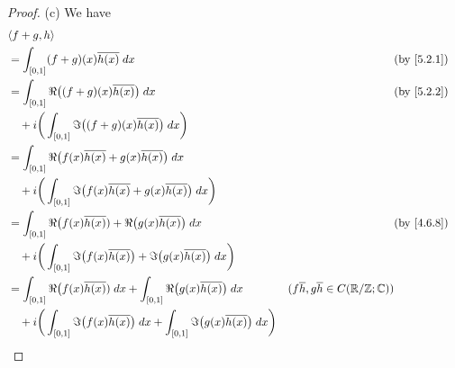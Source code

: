 \begin{proof}{(c)}
  We have
  \begin{align*}
     & \inner*{f + g, h}                                                                                                                                                                                       \\
     & = \int_{[0, 1]} (f + g)(x) \overline{h(x)} \; dx                                                                                    &                                                      & \by{5.2.1} \\
     & = \int_{[0, 1]} \Re\big((f + g)(x) \overline{h(x)}\big) \; dx                                                                       &                                                      & \by{5.2.2} \\
     & \quad + i \bigg(\int_{[0, 1]} \Im\big((f + g)(x) \overline{h(x)}\big) \; dx\bigg)                                                                                                                       \\
     & = \int_{[0, 1]} \Re\big(f(x) \overline{h(x)} + g(x) \overline{h(x)}\big) \; dx                                                                                                                          \\
     & \quad + i \bigg(\int_{[0, 1]} \Im\big(f(x) \overline{h(x)} + g(x) \overline{h(x)}\big) \; dx\bigg)                                                                                                      \\
     & = \int_{[0, 1]} \Re\big(f(x) \overline{h(x)}) + \Re\big(g(x) \overline{h(x)}\big) \; dx                                             &                                                      & \by{4.6.8} \\
     & \quad + i \bigg(\int_{[0, 1]} \Im\big(f(x) \overline{h(x)}\big) + \Im\big(g(x) \overline{h(x)}\big) \; dx\bigg)                                                                                         \\
     & = \int_{[0, 1]} \Re\big(f(x) \overline{h(x)}) \; dx + \int_{[0, 1]} \Re\big(g(x) \overline{h(x)}\big) \; dx                         & (f \overline{h}, g \overline{h} \in C(\R / \Z ; \C))              \\
     & \quad + i \bigg(\int_{[0, 1]} \Im\big(f(x) \overline{h(x)}\big) \; dx + \int_{[0, 1]} \Im\big(g(x) \overline{h(x)}\big) \; dx\bigg)                                                                     \\

\end{align*}
\end{proof}
